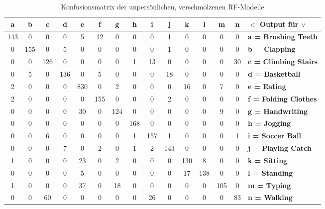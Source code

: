 \begin{table}
\centering
\begin{tabular}{|c|c|c|c|c|c|c|c|c|c|c|c|c|c||l|}
	\hline 
  \textbf{a} &   \textbf{b} &   \textbf{c} &   \textbf{d} &   \textbf{e} &   \textbf{f} &   \textbf{g} &   \textbf{h} &   \textbf{i} &   \textbf{j} &   \textbf{k} &   \textbf{l} &   \textbf{m}  &  \textbf{n} & \textbf{$<$ Output für $\vee$} \\
\hline 
\hline
143 &   0 &   0 &   0 &   5 &  12 &   0 &   0 &   0 &   1 &   0 &   0 &   0  &  0 &   \textbf{a = Brushing Teeth} \\
\hline 
0 & 155 &   0 &   5 &   0 &   0 &   0 &   0 &   0 &   1 &   0 &   0 &   0  &  0 &   \textbf{b = Clapping} \\
\hline 
0 &   0 & 126 &   0 &   0 &   0 &   0 &   1 &  13 &   0 &   0 &   0 &   0  & 30 &   \textbf{c = Climbing Stairs} \\
\hline 
0 &   5 &   0 & 136 &   0 &   5 &   0 &   0 &   0 &  18 &   0 &   0 &   0  &  0 &   \textbf{d = Basketball} \\
\hline 
2 &   0 &   0 &   0 & 830 &   0 &   2 &   0 &   0 &   0 &  16 &   0 &   7  &  0 &   \textbf{e = Eating} \\
\hline 
2 &   0 &   0 &   0 &   0 & 155 &   0 &   0 &   0 &   2 &   0 &   0 &   0  &  0 &   \textbf{f = Folding Clothes} \\
\hline 
0 &   0 &   0 &   0 &  30 &   0 & 124 &   0 &   0 &   0 &   0 &   0 &   9  &  0 &   \textbf{g = Handwriting} \\
\hline 
0 &   0 &   0 &   0 &   0 &   0 &   0 & 168 &   0 &   0 &   0 &   0 &   0  &  0 &   \textbf{h = Jogging} \\
\hline 
0 &   0 &   6 &   0 &   0 &   0 &   0 &   1 & 157 &   1 &   0 &   0 &   0  &  1 &   \textbf{i = Soccer Ball} \\
\hline 
0 &   0 &   0 &   7 &   0 &   2 &   0 &   1 &   2 & 143 &   0 &   0 &   0  &  0 &   \textbf{j = Playing Catch} \\
\hline 
1 &   0 &   0 &   0 &  23 &   0 &   2 &   0 &   0 &   0 & 130 &   8 &   0  &  0 &   \textbf{k = Sitting} \\
\hline 
0 &   0 &   0 &   0 &   5 &   0 &   0 &   0 &   0 &   0 &  17 & 138 &   0  &  0 &   \textbf{l = Standing} \\
\hline 
1 &   0 &   0 &   0 &  37 &   0 &  18 &   0 &   0 &   0 &   0 &   0 & 105  &  0 &   \textbf{m = Typing} \\
\hline 
0 &   0 &  60 &   0 &   0 &   0 &   0 &   0 &  26 &   0 &   0 &   0 &   0  & 83 &   \textbf{n = Walking} \\
	\hline 
\end{tabular}
\caption{Konfusionsmatrix der unpersönlichen, verschmolzenen \ac{RF}-Modelle}
\label{tab:confusion-impersonal-rf-merged}
\end{table}

